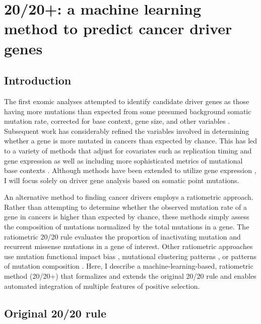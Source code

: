 
\chapter{20/20+: a machine learning method to predict cancer driver genes}
\label{chap:ch3}

\section{Introduction}

The first exomic analyses attempted to identify candidate driver genes as those having more mutations than expected from some presumed background somatic mutation rate, corrected for base context, gene size, and other variables \cite{RN78, RN4}. Subsequent work has considerably refined the variables involved in determining whether a gene is more mutated in cancers than expected by chance. This has led to a variety of  methods that adjust for covariates such as replication timing and gene expression as well as including more sophisticated metrics of mutational base contexts \cite{RN13, RN43}. Although methods have been extended to utilize gene expression \cite{RN80, RN84, RN81, RN83, RN79, RN82}, I will focus solely on driver gene analysis based on somatic point mutations.

An alternative method to finding cancer drivers employs a ratiometric approach. Rather than attempting to determine whether the observed mutation rate of a gene in cancers is higher than expected by chance, these methods simply assess the composition of mutations normalized by the total mutations in a gene. The ratiometric 20/20 rule \cite{RN25} evaluates the proportion of inactivating mutation and recurrent missense mutations in a gene of interest. Other ratiometric approaches use mutation functional impact bias \cite{RN86, RN53}, mutational clustering patterns \cite{RN87, RN54, RN71}, or patterns of mutation composition \cite{RN71}. Here, I describe a machine-learning-based, ratiometric method (20/20+) that formalizes and extends the original 20/20 rule and enables automated integration of multiple features of positive selection.

\section{Original 20/20 rule}

